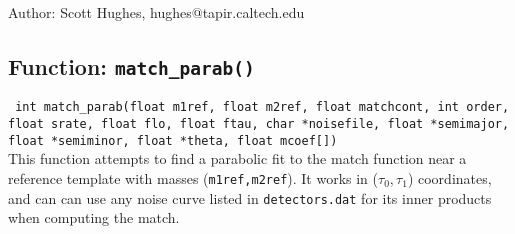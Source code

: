 \begin{description}
\item{Author:} Scott Hughes, hughes@tapir.caltech.edu
\end{description}

\clearpage
\subsection{Function: \tt{match\_parab()}}
\label{ss:match_parab}
{\tt
int match\_parab(float m1ref, float m2ref, float matchcont, int order, float srate, 
                float flo, float ftau, char *noisefile, float *semimajor, 
                float *semiminor, float *theta, float mcoef[])
}\\
This function attempts to find a parabolic fit to the match
function near a reference template with masses ({\tt m1ref,m2ref}).
It works in ($\tau_0,\tau_1$) coordinates, and can can use any noise
curve listed in {\tt detectors.dat} for its inner products when
computing the match.

